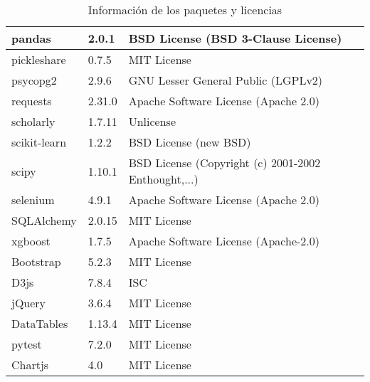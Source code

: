 \begin{table}[h]
\begin{tabular}{|l|l|l|}
pandas & 2.0.1 &  BSD License (BSD 3-Clause License) \\ \hline
pickleshare & 0.7.5 &  MIT License \\ \hline
psycopg2 & 2.9.6 &  GNU Lesser General Public (LGPLv2) \\ \hline
requests & 2.31.0 &  Apache Software License (Apache 2.0) \\ \hline
scholarly & 1.7.11 &  Unlicense \\ \hline
scikit-learn & 1.2.2 & BSD License (new BSD) \\ \hline
scipy & 1.10.1 &  BSD License (Copyright (c) 2001-2002 Enthought,...) \\ \hline
selenium & 4.9.1 &  Apache Software License (Apache 2.0) \\ \hline
SQLAlchemy & 2.0.15 &  MIT License \\ \hline
xgboost & 1.7.5 &  Apache Software License (Apache-2.0) \\ \hline
Bootstrap & 5.2.3 &  MIT License \\ \hline
D3js & 7.8.4 &  ISC \\ \hline
jQuery & 3.6.4 &  MIT License \\ \hline
DataTables & 1.13.4 &  MIT License \\ \hline
pytest & 7.2.0 &  MIT License \\ \hline
Chartjs & 4.0 & MIT License \\ \hline
\end{tabular}
\caption{Información de los paquetes y licencias}
\label{tab:paquetes-licencias}
\end{table}


